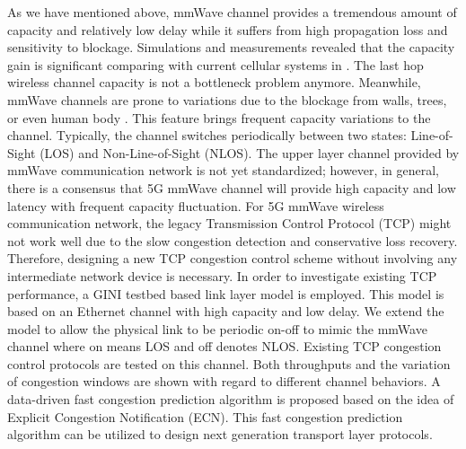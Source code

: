 \par As we have mentioned above, mmWave channel provides a tremendous amount of capacity and relatively low delay while it suffers from high propagation loss and sensitivity to blockage. Simulations and measurements revealed that the capacity gain is significant comparing with current cellular systems in \cite{akdeniz2014millimeter,bai2015coverage}. The last hop wireless channel capacity is not a bottleneck problem anymore. Meanwhile, mmWave channels are prone to variations due to the blockage from walls, trees, or even human body \cite{lu2012modeling, zhao201328, alejos2008measurement}. This feature brings frequent capacity variations to the channel. Typically, the channel switches periodically between two states: Line-of-Sight (LOS) and Non-Line-of-Sight (NLOS). The upper layer channel provided by mmWave communication network is not yet standardized; however, in general, there is a consensus that 5G mmWave channel will provide high capacity and low latency with frequent capacity fluctuation. For 5G mmWave wireless communication network, the legacy Transmission Control Protocol (TCP) might not work well due to the slow congestion detection and conservative loss recovery. Therefore, designing a new TCP congestion control scheme without involving any intermediate network device is necessary. In order to investigate existing TCP performance, a GINI testbed based link layer model is employed. This model is based on an Ethernet channel with high capacity and low delay. We extend the model to allow the physical link to be periodic on-off to mimic the mmWave channel where on means LOS and off denotes NLOS. Existing TCP congestion control protocols are tested on this channel. Both throughputs and the variation of congestion windows are shown with regard to different channel behaviors. A data-driven fast congestion prediction algorithm is proposed based on the idea of Explicit Congestion Notification (ECN). This fast congestion prediction algorithm can be utilized to design next generation transport layer protocols.
